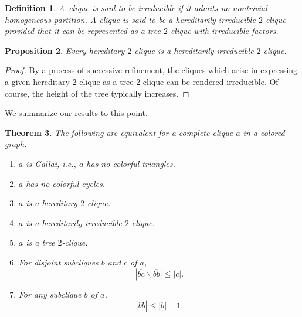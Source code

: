\documentclass[12pt]{amsart}
\newtheorem{theorem}{Theorem}[section]
\theoremstyle{plain}
\newtheorem{definition}[theorem]{Definition}
\newtheorem{proposition}[theorem]{Proposition}
\numberwithin{equation}{section}
\begin{document}
\begin{definition}
A\ clique is said to be \emph{irreducible} if it admits no nontrivial
homogeneous partition. A clique is said to be a \emph{hereditarily irreducible
}$2$\emph{-clique} provided that it can be represented as a tree $2$-clique
with irreducible factors.
\end{definition}

\begin{proposition}
\label{1}Every hereditary $2$-clique is a hereditarily irreducible $2$-clique.
\end{proposition}

\begin{proof}
By a process of successive refinement, the cliques which arise in expressing a
given hereditary $2$-clique as a tree $2$-clique can be rendered irreducible.
Of course, the height of the tree typically increases.
\end{proof}

We summarize our results to this point.

\begin{theorem}
\label{4}The following are equivalent for a complete clique $a$ in a colored graph.

\begin{enumerate}
\item $a$ is Gallai, i.e., $a$ has no colorful triangles.

\item $a$ has no colorful cycles.

\item $a$ is a hereditary $2$-clique.

\item $a$ is a hereditarily irreducible $2$-clique.

\item $a$ is a tree $2$-clique.

\item For disjoint subcliques $b$ and $c$ of $a$,
\begin{displaymath}
    \left\vert \overline{bc}\smallsetminus\overline{bb}\right\vert \leq\left\vert
    c\right\vert .
\end{displaymath}


\item For any subclique $b$ of $a$,
\begin{displaymath}
    \left\vert \overline{bb}\right\vert \leq\left\vert b\right\vert -1.
\end{displaymath}

\end{enumerate}
\end{theorem}
\end{document}

